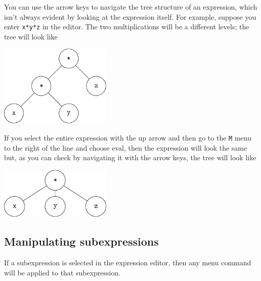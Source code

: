 \documentclass[a4paper,11pt]{book}
\begin{document}
You can use the arrow keys to navigate the tree structure of an
expression, which isn't always evident by looking at the expression
itself.  For example, suppose you enter \texttt{x*y*z} in the editor.
The two multiplications will be a different levels; the tree will look
like
\begin{center}
  \includegraphics[width=0.4\textwidth]{xyz-tree.png}
\end{center}
If you select the entire expression with the up arrow and then go to
the \texttt{M} menu to the right of the line and choose eval, then the
expression will look the same but, as you can check by navigating it
with the arrow keys, the tree will look like
\begin{center}
  \includegraphics[width=0.4\textwidth]{xyz-tree2.png}
\end{center}

\subsection{Manipulating subexpressions}

If a subexpression is selected in the expression editor, then any menu
command will be applied to that subexpression.  
\end{document}
